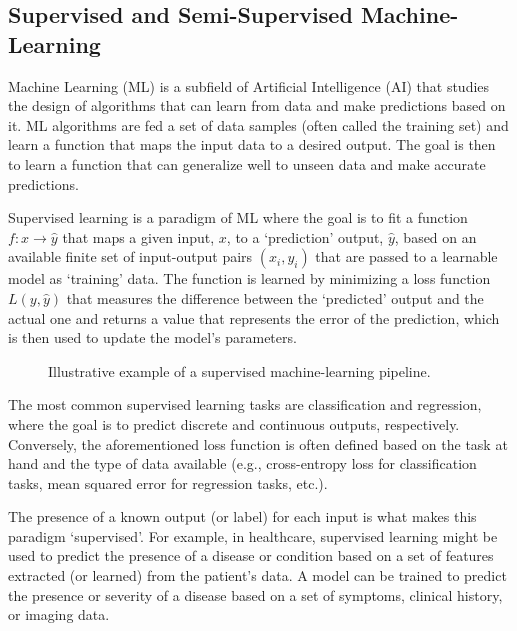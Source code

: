 \documentclass[../main.tex]{subfiles}
\begin{document}
    \subsection{Supervised and Semi-Supervised Machine-Learning} \label{sec:supervised_ml}

    Machine Learning (ML) is a subfield of Artificial Intelligence (AI) that studies the design of algorithms that can learn from data and make predictions based on it. ML algorithms are fed a set of data samples (often called the training set) and learn a function that maps the input data to a desired output. The goal is then to learn a function that can generalize well to unseen data and make accurate predictions. 


    Supervised learning is a paradigm of ML where the goal is to fit a function $f: x \rightarrow \hat{y}$ that maps a given input, $x$, to a `prediction' output, $\hat{y}$, based on an available finite set of input-output pairs $(x_i, y_i)$ that are passed to a learnable model as `training' data. The function is learned by minimizing a loss function $L(y, \hat{y})$ that measures the difference between the `predicted' output and the actual one and returns a value that represents the error of the prediction, which is then used to update the model's parameters.
    
    \begin{figure}[h]
        \centering
        \resizebox*{0.9\columnwidth}{!}{
            
        }
        \caption{Illustrative example of a supervised machine-learning pipeline.}
        \label{fig:supervised_learning}
    \end{figure}


    The most common supervised learning tasks are classification and regression, where the goal is to predict discrete and continuous outputs, respectively. Conversely, the aforementioned loss function is often defined based on the task at hand and the type of data available (e.g., cross-entropy loss for classification tasks, mean squared error for regression tasks, etc.).

    The presence of a known output (or label) for each input is what makes this paradigm `supervised'. For example, in healthcare, supervised learning might be used to predict the presence of a disease or condition based on a set of features extracted (or learned) from the patient's data. A model can be trained to predict the presence or severity of a disease based on a set of symptoms, clinical history, or imaging data.
\end{document}
